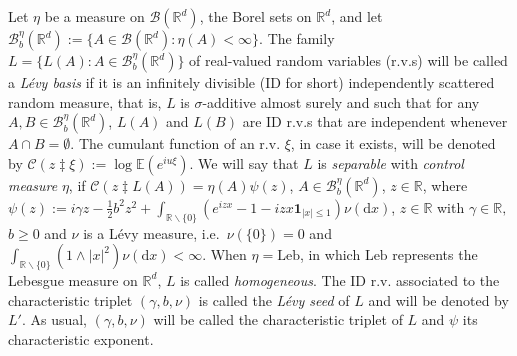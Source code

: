 \documentclass{article}
\theoremstyle{plain}
\theoremstyle{definition}
\theoremstyle{remark}
\newcommand{\Leb}{\ensuremath{\mathrm{Leb}}}
\newcommand{\Levy}{L\'{e}vy }
\begin{document}
Let $\eta$ be a measure on $\mathcal{B}(\mathbb{R}^{d})$, the Borel
sets on $\mathbb{R}^{d}$, and let $\mathcal{B}_{b}^{\eta}(\mathbb{R}^{d}):=\{A\in\mathcal{B}(\mathbb{R}^{d}):\eta(A)<\infty\}.$
The family $L=\{L\left(A\right):A\in\mathcal{B}_{b}^{\eta}(\mathbb{R}^{d})\}$
of real-valued random variables (r.v.s) will be called a \textit{\Levy basis} if it is
an infinitely divisible (ID for short) independently scattered random
measure, that is, $L$ is $\sigma$-additive almost surely and such
that for any $A,B\in\mathcal{B}_{b}^{\eta}(\mathbb{R}^{d})$, $L(A)$
and $L(B)$ are ID r.v.s that are independent whenever $A\cap B=\emptyset$.
The cumulant function of an r.v. $\xi$, in case it exists, will be denoted
by $\mathcal{C}(z\ddagger\xi):=\log\mathbb{E}(e^{iu\xi})$. We will
say that $L$ is \textit{separable} with \textit{control measure}
$\eta$, if 
$ 	\mathcal{C}(z\ddagger L(A))=\eta(A)\psi(z)$, $A\in\mathcal{B}_{b}^{\eta}(\mathbb{R}^{d})$, $z\in\mathbb{R}$, 
where 
$ 
\psi(z):=i\gamma z-\frac{1}{2}b^{2}z^{2}+\int_{\mathbb{R}\backslash\{0\}}(e^{izx}-1-izx\mathbf{1}_{\left|x\right|\leq1})\nu(\mathrm{d}x)$, $z\in\mathbb{R}$ 
with $\gamma\in\mathbb{R},$ $b\geq0$ and $\nu$ is a \Levy measure,
i.e.~$\nu(\{0\})=0$ and $\int_{\mathbb{R}\backslash\{0\}}(1\land\left|x\right|^{2})\nu(\mathrm{d}x)<\infty$.
When $\eta=\Leb$, in which $\Leb$ represents the Lebesgue measure on
$\mathbb{R}^{d}$, $L$ is called \textit{homogeneous}. The ID r.v.
associated to the characteristic triplet $\left(\gamma,b,\nu\right)$
is called the \textit{\Levy seed} of $L$ and will be denoted by $L'$.
As usual, $\left(\gamma,b,\nu\right)$ will be called the characteristic
triplet of $L$ and $\psi$ its characteristic exponent.
\end{document}
